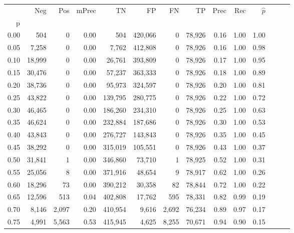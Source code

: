 \begin{tabular}{rrrrrrrrrrrrrr}
\toprule
{} &     Neg &     Pos & mPrec &       TN &       FP &      FN &      TP &  Prec &   Rec & $\hat{p}$ \\
p    &         &         &       &          &          &         &         &       &       &           \\
\midrule
0.00 &     504 &       0 &  0.00 &      504 &  420,066 &       0 &  78,926 &  0.16 &  1.00 &      1.00 \\
0.05 &   7,258 &       0 &  0.00 &    7,762 &  412,808 &       0 &  78,926 &  0.16 &  1.00 &      0.98 \\
0.10 &  18,999 &       0 &  0.00 &   26,761 &  393,809 &       0 &  78,926 &  0.17 &  1.00 &      0.95 \\
0.15 &  30,476 &       0 &  0.00 &   57,237 &  363,333 &       0 &  78,926 &  0.18 &  1.00 &      0.89 \\
0.20 &  38,736 &       0 &  0.00 &   95,973 &  324,597 &       0 &  78,926 &  0.20 &  1.00 &      0.81 \\
0.25 &  43,822 &       0 &  0.00 &  139,795 &  280,775 &       0 &  78,926 &  0.22 &  1.00 &      0.72 \\
0.30 &  46,465 &       0 &  0.00 &  186,260 &  234,310 &       0 &  78,926 &  0.25 &  1.00 &      0.63 \\
0.35 &  46,624 &       0 &  0.00 &  232,884 &  187,686 &       0 &  78,926 &  0.30 &  1.00 &      0.53 \\
0.40 &  43,843 &       0 &  0.00 &  276,727 &  143,843 &       0 &  78,926 &  0.35 &  1.00 &      0.45 \\
0.45 &  38,292 &       0 &  0.00 &  315,019 &  105,551 &       0 &  78,926 &  0.43 &  1.00 &      0.37 \\
0.50 &  31,841 &       1 &  0.00 &  346,860 &   73,710 &       1 &  78,925 &  0.52 &  1.00 &      0.31 \\
0.55 &  25,056 &       8 &  0.00 &  371,916 &   48,654 &       9 &  78,917 &  0.62 &  1.00 &      0.26 \\
0.60 &  18,296 &      73 &  0.00 &  390,212 &   30,358 &      82 &  78,844 &  0.72 &  1.00 &      0.22 \\
0.65 &  12,596 &     513 &  0.04 &  402,808 &   17,762 &     595 &  78,331 &  0.82 &  0.99 &      0.19 \\
0.70 &   8,146 &   2,097 &  0.20 &  410,954 &    9,616 &   2,692 &  76,234 &  0.89 &  0.97 &      0.17 \\
0.75 &   4,991 &   5,563 &  0.53 &  415,945 &    4,625 &   8,255 &  70,671 &  0.94 &  0.90 &      0.15 \\

\end{tabular}
